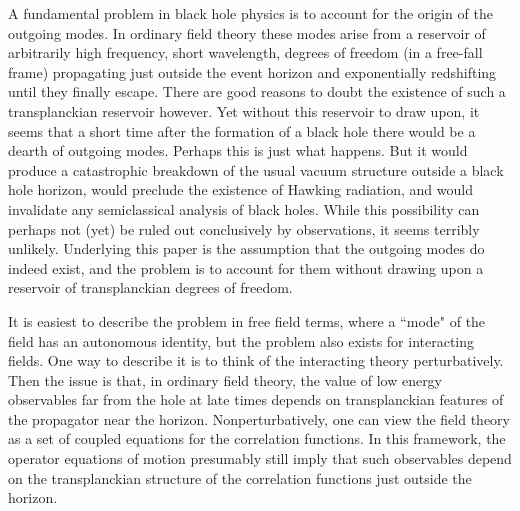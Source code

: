 \documentclass[12pt]{article}
\begin{document}
A fundamental problem in black hole physics is to account for the
origin of the outgoing modes. In ordinary field theory these modes
arise from a reservoir of arbitrarily high frequency, short wavelength,
degrees of freedom (in a free-fall frame) propagating just outside the
event horizon and exponentially redshifting until they finally escape.
There are good reasons to doubt the existence of such a transplanckian
reservoir however.  Yet without this reservoir to draw upon, it seems
that a short time after the formation of a black hole there would be a
dearth of outgoing modes\cite{Jaco1}. Perhaps this is just what
happens.  But it would produce a catastrophic breakdown of the usual
vacuum structure outside a black hole horizon, would preclude the
existence of Hawking radiation, and would invalidate any semiclassical
analysis of black holes.  While this possibility can perhaps not (yet)
be ruled out conclusively by observations, it seems terribly unlikely.
Underlying this paper is the assumption that the outgoing modes do
indeed exist, and the problem is to account for them without drawing
upon a reservoir of transplanckian degrees of freedom.

It is easiest to describe the problem in free field terms, where a
``mode" of the field has an autonomous identity, but the problem also
exists for interacting fields. One way to describe it is to think of
the interacting theory perturbatively. Then the issue is that, in
ordinary field theory, the value of low energy observables far from the
hole at late times depends on transplanckian features of the propagator
near the horizon\cite{FredHaag}.  Nonperturbatively, one can view the
field theory as a set of coupled equations for the correlation
functions. In this framework, the operator equations of motion
presumably still imply that such observables depend on the
transplanckian structure of the correlation functions just outside the
horizon.
\end{document}
